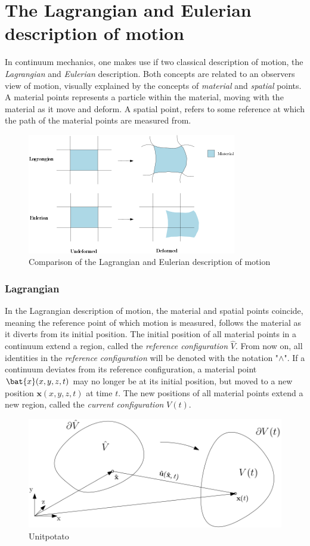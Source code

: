 \section{The Lagrangian and Eulerian description of motion}
In continuum mechanics, one makes use if two classical description of motion, the \textit{Lagrangian} and \textit{Eulerian} description. Both concepts are related to an observers view of motion, visually explained by the concepts of \textit{material} and \textit{spatial} points. A material points represents a particle within the material, moving with the material as it move and deform. A spatial point, refers to some reference at which the path of the material points are measured from. 

\begin{figure}[h!]
  \centering
    \includegraphics[scale=0.9]{./Fig/lageul.png}
      \caption{Comparison of the Lagrangian and Eulerian description of motion}
\end{figure}


\subsubsection*{Lagrangian}
In the Lagrangian description of motion, the material and spatial points coincide, meaning the reference point of which motion is measured, follows the material as it diverts from its initial position. The initial position of all material points in a continuum extend a region, called the \textit{reference configuration} $\hat{V}$. From now on, all identities in the \textit{reference configuration} will be denoted with the notation "$\wedge$". If a continuum deviates from its reference configuration, a material point $\bat{x}(x, y, z ,t)$ may no longer be at its initial position, but moved to a new position $\mathbf{x}(x, y, z, t)$ at time $t$.  The new positions of all material points extend a new region, called the \textit{current configuration} $V(t)$. 
\newpage

\begin{figure}[h!]
  \centering
    \includegraphics[scale=0.4]{./Fig/unitpotato.png}
      \caption{Unitpotato}
\end{figure}

